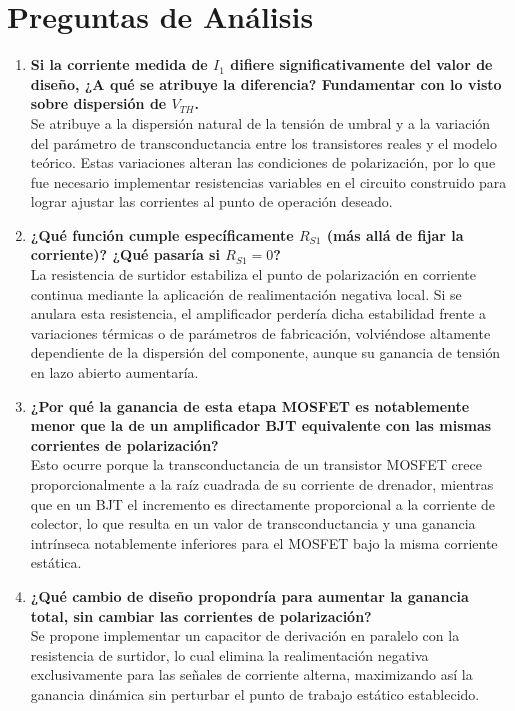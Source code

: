 \section{Preguntas de Análisis}

\begin{enumerate}

\item \textbf{Si la corriente medida de $I_1$ difiere significativamente del valor de diseño, ¿A qué se atribuye la diferencia? Fundamentar con lo visto sobre dispersión de $V_{TH}$.} \\
Se atribuye a la dispersión natural de la tensión de umbral y a la variación del parámetro de transconductancia entre los transistores reales y el modelo teórico. Estas variaciones alteran las condiciones de polarización, por lo que fue necesario implementar resistencias variables en el circuito construido para lograr ajustar las corrientes al punto de operación deseado.

\item \textbf{¿Qué función cumple específicamente $R_{S1}$ (más allá de fijar la corriente)? ¿Qué pasaría si $R_{S1} = 0$?} \\
La resistencia de surtidor estabiliza el punto de polarización en corriente continua mediante la aplicación de realimentación negativa local. Si se anulara esta resistencia, el amplificador perdería dicha estabilidad frente a variaciones térmicas o de parámetros de fabricación, volviéndose altamente dependiente de la dispersión del componente, aunque su ganancia de tensión en lazo abierto aumentaría.

\item \textbf{¿Por qué la ganancia de esta etapa MOSFET es notablemente menor que la de un amplificador BJT equivalente con las mismas corrientes de polarización?} \\
Esto ocurre porque la transconductancia de un transistor MOSFET crece proporcionalmente a la raíz cuadrada de su corriente de drenador, mientras que en un BJT el incremento es directamente proporcional a la corriente de colector, lo que resulta en un valor de transconductancia y una ganancia intrínseca notablemente inferiores para el MOSFET bajo la misma corriente estática.

\item \textbf{¿Qué cambio de diseño propondría para aumentar la ganancia total, sin cambiar las corrientes de polarización?} \\
Se propone implementar un capacitor de derivación en paralelo con la resistencia de surtidor, lo cual elimina la realimentación negativa exclusivamente para las señales de corriente alterna, maximizando así la ganancia dinámica sin perturbar el punto de trabajo estático establecido.


\end{enumerate}
